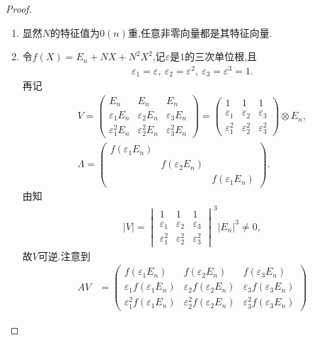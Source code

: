 \documentclass[../../main.tex]{subfiles}
\begin{document}
\begin{proof}
\begin{enumerate}[(1)]
\item 显然$N$的特征值为$0$$(n)$重,任意非零向量都是其特征向量.

\item 令$f(X) = E_n + NX + N^2X^2$,记$\varepsilon$是$1$的三次单位根,且
\begin{align}
\varepsilon_1 = \varepsilon,\ \varepsilon_2 = \varepsilon^2,\ \varepsilon_3 = \varepsilon^3 = 1.\label{eq:108.98}
\end{align}
再记
\begin{gather*}
V = \begin{pmatrix}
E_n & E_n & E_n\\
\varepsilon_1 E_n & \varepsilon_2 E_n & \varepsilon_3 E_n\\
\varepsilon_1^2 E_n & \varepsilon_2^2 E_n & \varepsilon_3^2 E_n
\end{pmatrix} = \begin{pmatrix}
1 & 1 & 1\\
\varepsilon_1 & \varepsilon_2 & \varepsilon_3\\
\varepsilon_1^2 & \varepsilon_2^2 & \varepsilon_3^2
\end{pmatrix} \otimes E_n, \\
\Lambda = \begin{pmatrix}
f(\varepsilon_1 E_n) & & \\
& f(\varepsilon_2 E_n) & \\
& & f(\varepsilon_1 E_n)
\end{pmatrix}.
\end{gather*}
由知
\begin{align*}
|V| = \begin{vmatrix}
1 & 1 & 1\\
\varepsilon_1 & \varepsilon_2 & \varepsilon_3\\
\varepsilon_1^2 & \varepsilon_2^2 & \varepsilon_3^2
\end{vmatrix}^3 |E_n|^3 \ne 0,
\end{align*}
故$V$可逆.注意到
\begin{align*}
AV &= \begin{pmatrix}
f(\varepsilon_1 E_n) & f(\varepsilon_2 E_n) & f(\varepsilon_3 E_n)\\
\varepsilon_1 f(\varepsilon_1 E_n) & \varepsilon_2 f(\varepsilon_2 E_n) & \varepsilon_3 f(\varepsilon_3 E_n)\\
\varepsilon_1^2 f(\varepsilon_1 E_n) & \varepsilon_2^2 f(\varepsilon_2 E_n) & \varepsilon_3^2 f(\varepsilon_3 E_n)

\end{pmatrix}
\end{align*}
\end{enumerate}
\end{proof}
\end{document}
